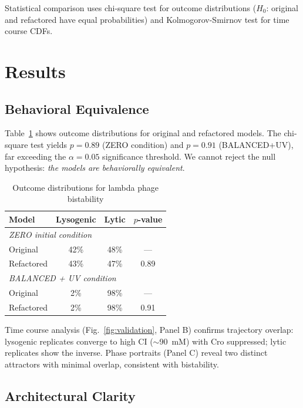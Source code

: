 \documentclass[twocolumn,10pt]{article}
\begin{document}
Statistical comparison uses chi-square test for outcome distributions ($H_0$: original and refactored have equal probabilities) and Kolmogorov-Smirnov test for time course CDFs.

\section{Results}

\subsection{Behavioral Equivalence}

Table~\ref{tab:outcomes} shows outcome distributions for original and refactored models. The chi-square test yields $p=0.89$ (ZERO condition) and $p=0.91$ (BALANCED+UV), far exceeding the $\alpha=0.05$ significance threshold. We cannot reject the null hypothesis: \textit{the models are behaviorally equivalent}.

\begin{table}[h]
\centering
\caption{Outcome distributions for lambda phage bistability}
\label{tab:outcomes}
\begin{tabular}{lccc}
\toprule
\textbf{Model} & \textbf{Lysogenic} & \textbf{Lytic} & \textbf{$p$-value} \\
\midrule
\multicolumn{4}{l}{\textit{ZERO initial condition}} \\
Original & 42\% & 48\% & --- \\
Refactored & 43\% & 47\% & 0.89 \\
\midrule
\multicolumn{4}{l}{\textit{BALANCED + UV condition}} \\
Original & 2\% & 98\% & --- \\
Refactored & 2\% & 98\% & 0.91 \\
\bottomrule
\end{tabular}
\end{table}

Time course analysis (Fig.~\ref{fig:validation}, Panel B) confirms trajectory overlap: lysogenic replicates converge to high CI ($\sim$90~mM) with Cro suppressed; lytic replicates show the inverse. Phase portraits (Panel C) reveal two distinct attractors with minimal overlap, consistent with bistability.

\subsection{Architectural Clarity}
\end{document}
